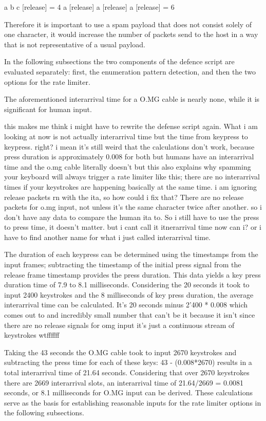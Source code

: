 a b c [release] = 4
a [release] a [release] a [release] = 6

Therefore it is important to use a spam payload that does not consist solely of one character, it would increase the number of packets send to the host in a way that is not representative of a usual payload.

In the following subsections the two components of the defence script are evaluated separately: first, the enumeration pattern detection, and then the two options for the rate limiter.



\iffalse
The aforementioned interarrival time for a O.MG cable is nearly none, while it is significant for human input. 

this makes me think i might have to rewrite the defense script again. What i am looking at now is not actually interarrival time but the time from keypress to keypress. right? i mean it's still weird that the calculations don't work, because press duration is approximately 0.008 for both but humans have an interarrival time and the o.mg cable literally doesn't but this also explains why spamming your keyboard will always trigger a rate limiter like this; there are no interarrival times if your keystrokes are happening basically at the same time. 
i am ignoring release packets rn with the ita, so how could i fix that?
There are no release packets for o.mg input, not unless it's the same character twice after another. so i don't have any data to compare the human ita to. 
So i still have to use the press to press time, it doesn't matter. but i cant call it itnerarrival time now can i? or i have to find another name for what i just called interarrival time. 



The duration of each keypress can be determined using the timestamps from the input frames; subtracting the timestamp of the initial press signal from the release frame timestamp provides the press duration. This data yields a key press duration time of 7.9 to 8.1 milliseconds.
Considering the 20 seconds it took to input 2400 keystrokes and the 8 milliseconds of key press duration, the average interarrival time can be calculated. It's 20 seconds minus 2'400 * 0.008 which comes out to and incredibly small number that can't be it because it isn't since there are no release signals for omg input it's just a continuous stream of keystrokes wtffffff  


Taking the 43 seconds the O.MG cable took to input 2670 keystrokes and subtracting the press time for each of these keys: 43 - (0.008*2670) results in a total interarrival time of 21.64 seconds. Considering that over 2670 keystrokes there are 2669 interarrival slots, an interarrival time of 21.64/2669 = 0.0081 seconds, or 8.1 milliseconds for O.MG input can be derived. These calculations serve as the basis for establishing reasonable inputs for the rate limiter options in the following subsections.  

